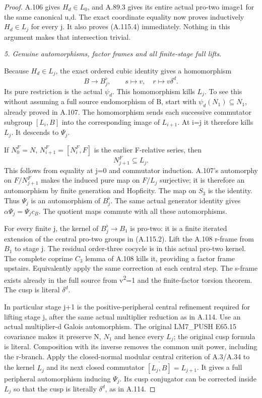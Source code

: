 \begin{proof}
A.106 gives \(H_d\in L_0\), and A.89.3 gives its entire actual pro-two image1 for the same canonical u,d. The exact coordinate equality now proves inductively \(H_d\in L_j\) for every j. It also proves (A.115.4) immediately. Nothing in this argument makes that intersection trivial.

\medskip\noindent\emph{5. Genuine automorphisms, factor frames and all finite-stage full lifts}.

Because \(H_d\in L_j\), the exact ordered cubic identity gives a homomorphism
\[
B\to B_j^\flat,\qquad s\mapsto v,\quad r\mapsto v\delta^d.
\]
Its pure restriction is the actual \(\psi_d\). This homomorphism kills \(L_j\). To see this without assuming a full source endomorphism of B, start with \(\psi_d(N_1)\subseteq N_1\), already proved in A.107. The homomorphism sends each successive commutator subgroup \([L_i,B]\) into the corresponding image of \(L_{i+1}\). At i=j it therefore kills \(L_j\). It descends to \(\Psi_j\).

If \(N^{F}_0=N\), \(N^{F}_{i+1}=[N^{F}_i,F]\) is the earlier F-relative series, then
\[
N^{F}_{j+1}\subseteq L_j.
\]
This follows from equality at j=0 and commutator induction. A.107's automorphy on \(F/N^{F}_{j+1}\) makes the induced pure map on \(F/L_j\) surjective; it is therefore an automorphism by finite generation and Hopficity. The map on \(S_3\) is the identity. Thus \(\Psi_j\) is an automorphism of \(B_j^\flat\). The same actual generator identity gives \(\alpha\Psi_j=\Psi_jc_B\). The quotient maps commute with all these automorphisms.

For every finite j, the kernel of \(B_j^\flat\to B_1\) is pro-two: it is a finite iterated extension of the central pro-two groups in (A.115.2). Lift the A.108 r-frame from \(B_1\) to stage j. The residual order-three cocycle is in this actual pro-two kernel. The complete coprime \(C_3\) lemma of A.108 kills it, providing a factor frame upstairs. Equivalently apply the same correction at each central step. The s-frame exists already in the full source from v\textsuperscript{2}=1 and the finite-factor torsion theorem. The cusp is literal \(\delta^d\).

In particular stage j+1 is the positive-peripheral central refinement required for lifting stage j, after the same actual multiplier reduction as in A.114. Use an actual multiplier-d Galois automorphism. The original LM7\_PUSH E65.15 covariance makes it preserve N, \(N_1\) and hence every \(L_j\); the original cusp formula is literal. Composition with its inverse removes the common unit power, including the r-branch. Apply the closed-normal modular central criterion of A.3/A.34 to the kernel \(L_j\) and its next closed commutator \(\overline{[L_j,B]}=L_{j+1}\). It gives a full peripheral automorphism inducing \(\Psi_j\). Its cusp conjugator can be corrected inside \(L_j\) so that the cusp is literally \(\delta^d\), as in A.114.


\end{proof}
